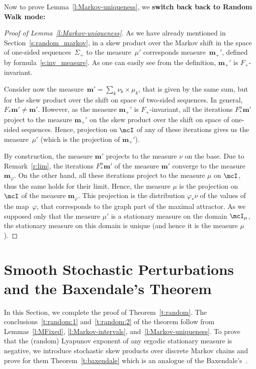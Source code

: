 \documentclass[a4paper,12pt]{amsart}
\begin{document}
Now to prove Lemma~\ref{l:Markov-uniqueness}, we \textbf{switch back
back to Random Walk mode:}
\begin{proof}[Proof of Lemma~\ref{l:Markov-uniqueness}]
As we have already mentioned in Section~\ref{s:random_markov}, in a skew product over the Markov shift in the space of one-sided sequences~$\Sigma_+$
to the measure~$\mu'$ corresponds measure~$\mathbf{m}_+'$, defined by formula~\eqref{e:inv_measure}.
As one can easily see from the definition, $\mathbf{m}_+'$ is $F_+$-invariant.

Consider now the measure~$\mathbf{m}' = \sum_k \nu_k \times \mu_k$, that is given by the same sum, but for the skew product over the shift on space of two-sided sequences. In general, $F_* \mathbf{m}' \ne \mathbf{m}'$. However, as the measure $\mathbf{m}_+'$ is $F_+$-invariant, all the iterations $F_*^n \mathbf{m}'$ project to the measure $\mathbf{m}_+'$ on the skew product over the shift on space of one-sided sequences. Hence, projection on $\mcI$ of any of these iterations gives us the measure~$\mu'$ (which is the projection of $\mathbf{m}_+'$).




By construction, the measure $\mathbf{m}'$ projects to the measure $\nu$ on the base. Due to Remark~\ref{r:lim}, the iterations $F_*^n\mathbf{m}'$ of the measure $\mathbf{m}'$ converge to the measure $\mathbf{m}_{\varphi}$. On the other hand, all these iterations project to the measure $\mu$ on $\mcI$, thus the same holds for their limit. Hence, the measure $\mu$ is the projection on $\mcI$ of the measure $\mathbf{m}_{\varphi}$. This projection is the distribution $\varphi_*\nu$ of the values of the map~$\varphi$, that corresponds to the graph part of the maximal attractor. As we supposed only that  the measure $\mu'$ is a stationary measure on the domain $\mcI_{\mu}$, the stationary measure on this domain is unique (and hence it is the measure $\mu$).

\end{proof}


\section{Smooth Stochastic Perturbations and the Baxendale's Theorem}    \label{s:bax}

In this Section, we complete the proof of Theorem~\ref{t:random}. The conclusions~\ref{t:random:1} and~\ref{t:random:2} of the theorem follow from Lemmas~\ref{l:MFixed}, \ref{l:Markov-intervals}, and~\ref{l:Markov-uniqueness}. To prove that the (random) Lyapunov exponent of any ergodic stationary measure is negative, we introduce stochastic skew products over discrete Markov chains and prove for them Theorem~\ref{t:baxendale} which is an analogue of the Baxendale's~\cite[Theorem 4.2]{Baxendale1989}.
\end{document}
